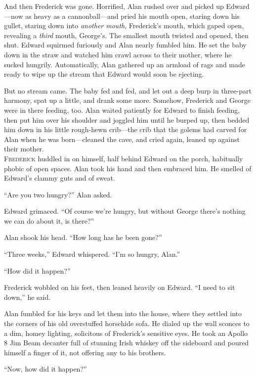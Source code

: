 \documentclass{article}
\begin{document}
And then Frederick was gone.  Horrified, Alan rushed over and picked
up Edward---now as heavy as a cannonball---and pried his mouth open,
staring down his gullet, staring down into \textit{another mouth},
Frederick's mouth, which gaped open, revealing a \textit{third} mouth,
George's.  The smallest mouth twisted and opened, then shut.  Edward
squirmed furiously and Alan nearly fumbled him.  He set the baby down
in the straw and watched him crawl across to their mother, where he
sucked hungrily.  Automatically, Alan gathered up an armload of rags
and made ready to wipe up the stream that Edward would soon be
ejecting.

But no stream came.  The baby fed and fed, and let out a deep burp in
three-part harmony, spat up a little, and drank some more.  Somehow,
Frederick and George were in there feeding, too.  Alan waited
patiently for Edward to finish feeding, then put him over his shoulder
and joggled him until he burped up, then bedded him down in his little
rough-hewn crib---the crib that the golems had carved for Alan when he
was born---cleaned the cave, and cried again, leaned up against their
mother.
\\
\lettrine[lines=3, lhang=.5, nindent=0pt, findent=2pt]{F}{rederick} huddled in on himself, half behind Edward on the porch,
habitually phobic of open spaces.  Alan took his hand and then
embraced him.  He smelled of Edward's clammy guts and of sweat.

``Are you two hungry?'' Alan asked.

Edward grimaced.  ``Of course we're hungry, but without George there's
nothing we can do about it, is there?''

Alan shook his head.  ``How long has he been gone?''

``Three weeks,'' Edward whispered.  ``I'm so hungry, Alan.''

``How did it happen?''

Frederick wobbled on his feet, then leaned heavily on Edward.  ``I
need to sit down,'' he said.

Alan fumbled for his keys and let them into the house, where they
settled into the corners of his old overstuffed horsehide sofa.  He
dialed up the wall sconces to a dim, homey lighting, solicitous of
Frederick's sensitive eyes.  He took an Apollo 8 Jim Beam decanter
full of stunning Irish whiskey off the sideboard and poured himself a
finger of it, not offering any to his brothers.

``Now, how did it happen?''
\end{document}
